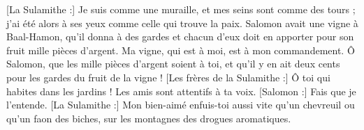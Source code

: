 \begin{multicols}{2}
[La Sulamithe :] Je suis comme une muraille, et mes seins sont comme des tours ; j'ai été alors à ses yeux comme celle qui trouve la paix. 
Salomon avait une vigne à Baal-Hamon, qu'il donna à des gardes et chacun d'eux  doit en apporter pour son fruit mille pièces d'argent. 
Ma vigne, qui est à moi, est à mon commandement. Ô Salomon, que les mille pièces d'argent soient à toi, et qu'il y en ait deux cents pour les gardes du fruit de la vigne !
[Les frères de la Sulamithe :] Ô toi qui habites dans les jardins ! Les amis sont attentifs à ta voix. [Salomon :] Fais que je l'entende. 
[La Sulamithe :] Mon bien-aimé enfuis-toi aussi vite qu'un chevreuil ou qu'un faon des biches, sur les montagnes des drogues aromatiques. 
\PPE{}
\end{multicols}
